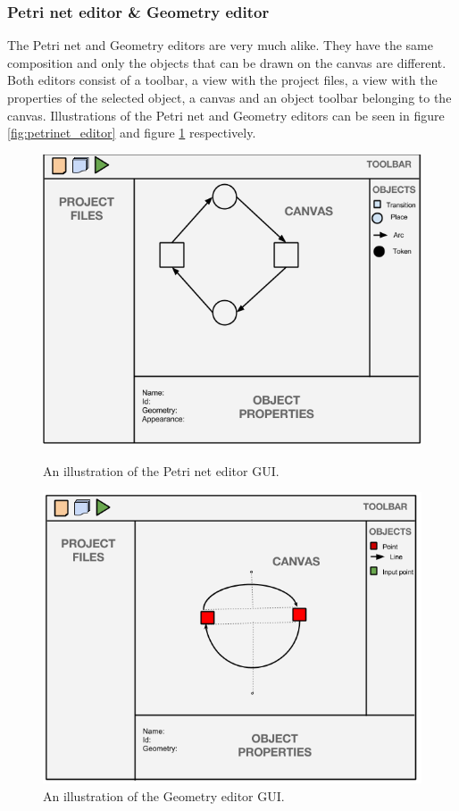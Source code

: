 \subsubsection{Petri net editor \& Geometry editor}
The Petri net and Geometry editors are very much alike. They have the same composition and only the objects that can be drawn on the canvas are different. Both editors consist of a toolbar, a view with the project files, a view with the properties of the selected object, a canvas and an object toolbar belonging to the canvas. Illustrations of the Petri net and Geometry editors  can be seen in figure \ref{fig:petrinet_editor} and figure \ref{fig:geometry_editor} respectively. 

\begin{figure}[ht]
	\begin{minipage}[b]{0.45\linewidth}
	\centering
		\includegraphics[scale=0.3]{image/petri.png}
\caption{An illustration of the Petri net editor GUI.}
\label{fig:petrinet_editor}
	\end{minipage}
\hspace{0.5cm}
	\begin{minipage}[b]{0.45\linewidth}
	\centering
		\includegraphics[scale=0.3]{image/geometry.png}
\caption{An illustration of the Geometry editor GUI.}
\label{fig:geometry_editor}
	\end{minipage}


\end{figure}
